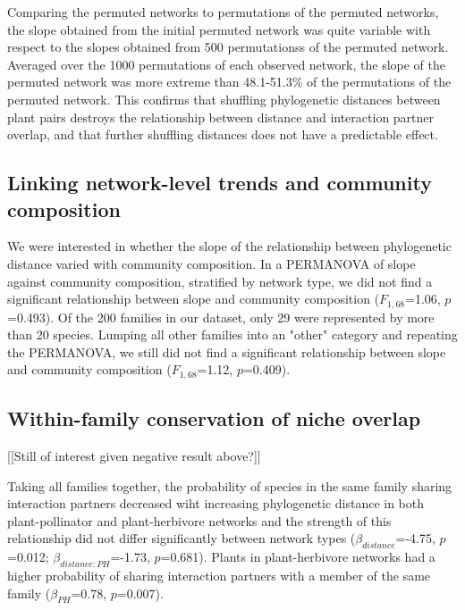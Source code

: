 \documentclass[12pt]{article}
\begin{document}
\begin{spacing}{1.5}
    Comparing the permuted networks to permutations of the permuted networks, the slope obtained from the initial permuted network was quite variable with respect to the slopes obtained from 500 permutationss of the permuted network. Averaged over the 1000 permutations of each observed network, the slope of the permuted network was more extreme than 48.1-51.3\% of the permutations of the permuted network. This confirms that shuffling phylogenetic distances between plant pairs destroys the relationship between distance and interaction partner overlap, and that further shuffling distances does not have a predictable effect.


  \subsection*{Linking network-level trends and community composition} 

    We were interested in whether the slope of the relationship between phylogenetic distance varied with community composition. In a PERMANOVA of slope against community composition, stratified by network type, we did not find a significant relationship between slope and community composition ($F_{1,68}$=1.06, $p$=0.493). Of the 200 families in our dataset, only 29 were represented by more than 20 species. Lumping all other families into an "other" category and repeating the PERMANOVA, we still did not find a significant relationship between slope and community composition ($F_{1,68}$=1.12, $p$=0.409). 


  \subsection*{Within-family conservation of niche overlap} [[Still of interest given negative result above?]]

    Taking all families together, the probability of species in the same family sharing interaction partners decreased wiht increasing phylogenetic distance in both plant-pollinator and plant-herbivore networks and the strength of this relationship did not differ significantly between network types ($\beta_{distance}$=-4.75, $p$=0.012; $\beta_{distance:PH}$=-1.73, $p$=0.681). Plants in plant-herbivore networks had a higher probability of sharing interaction partners with a member of the same family ($\beta_{PH}$=0.78, $p$=0.007).



\end{spacing}
\end{document}
